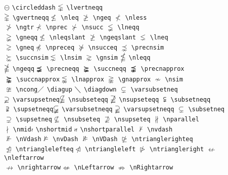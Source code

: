 \documentclass{asl}
\begin{document}
\begin{tabbing}
$\circleddash$ \>\verb+\circleddash+\>
$\lvertneqq$ \>\verb+\lvertneqq+\\
$\gvertneqq$ \>\verb+\gvertneqq+\>$\nleq$ \>\verb+\nleq+\>
$\ngeq$ \>\verb+\ngeq+\>
$\nless$ \>\verb+\nless+\\
$\ngtr$ \>\verb+\ngtr+\>$\nprec$ \>\verb+\nprec+\>
$\nsucc$ \>\verb+\nsucc+\>
$\lneqq$ \>\verb+\lneqq+\\
$\gneqq$ \>\verb+\gneqq+\>$\nleqslant$ \>\verb+\nleqslant+\>
$\ngeqslant$ \>\verb+\ngeqslant+\>
$\lneq$ \>\verb+\lneq+\\
$\gneq$ \>\verb+\gneq+\>$\npreceq$ \>\verb+\npreceq+\>
$\nsucceq$ \>\verb+\nsucceq+\>
$\precnsim$ \>\verb+\precnsim+\\
$\succnsim$ \>\verb+\succnsim+\>$\lnsim$ \>\verb+\lnsim+\>
$\gnsim$ \>\verb+\gnsim+\>
$\nleqq$ \>\verb+\nleqq+\\
$\ngeqq$ \>\verb+\ngeqq+\>$\precneqq$ \>\verb+\precneqq+\>
$\succneqq$ \>\verb+\succneqq+\>
$\precnapprox$ \>\verb+\precnapprox+\\
$\succnapprox$ \>\verb+\succnapprox+\>$\lnapprox$ \>\verb+\lnapprox+\>
$\gnapprox$ \>\verb+\gnapprox+\>
$\nsim$ \>\verb+\nsim+\\
$\ncong$ \>\verb+\ncong+\>$\diagup$ \>\verb+\diagup+\>
$\diagdown$ \>\verb+\diagdown+\>
$\varsubsetneq$ \>\verb+\varsubsetneq+\\
$\varsupsetneq$ \>\verb+\varsupsetneq+\>$\nsubseteqq$ \>\verb+\nsubseteqq+\>
$\nsupseteqq$ \>\verb+\nsupseteqq+\>
$\subsetneqq$ \>\verb+\subsetneqq+\\
$\supsetneqq$ \>\verb+\supsetneqq+\>$\varsubsetneqq$ \>\verb+\varsubsetneqq+\>
$\varsupsetneqq$ \>\verb+\varsupsetneqq+\>
$\subsetneq$ \>\verb+\subsetneq+\\
$\supsetneq$ \>\verb+\supsetneq+\>$\nsubseteq$ \>\verb+\nsubseteq+\>
$\nsupseteq$ \>\verb+\nsupseteq+\>
$\nparallel$ \>\verb+\nparallel+\\
$\nmid$ \>\verb+\nmid+\>$\nshortmid$ \>\verb+\nshortmid+\>
$\nshortparallel$ \>\verb+\nshortparallel+\>
$\nvdash$ \>\verb+\nvdash+\\
$\nVdash$ \>\verb+\nVdash+\>$\nvDash$ \>\verb+\nvDash+\>
$\nVDash$ \>\verb+\nVDash+\>
$\ntrianglerighteq$ \>\verb+\ntrianglerighteq+\\
$\ntrianglelefteq$ \>\verb+\ntrianglelefteq+\>$\ntriangleleft$ \>\verb+\ntriangleleft+\>
$\ntriangleright$ \>\verb+\ntriangleright+\>
$\nleftarrow$ \>\verb+\nleftarrow+\\
$\nrightarrow$ \>\verb+\nrightarrow+\>$\nLeftarrow$ \>\verb+\nLeftarrow+\>
$\nRightarrow$ \>\verb+\nRightarrow+\>

\end{tabbing}
\end{document}
